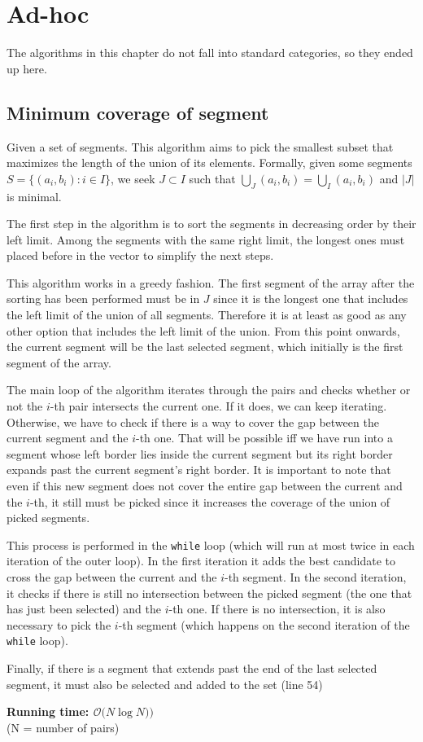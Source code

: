 \chapter{Ad-hoc}
The algorithms in this chapter do not fall into 
standard categories, so they ended up here. 
\section{Minimum coverage of segment}
Given a set of segments. This algorithm aims to pick the
smallest subset that maximizes the length of the union of
its elements.
Formally, given some segments $S=\{(a_i,b_i): i\in I\}$,
we seek $J\subset I$ such that $\bigcup_J (a_i,b_i)= \bigcup_I (a_i,b_i)$ and 
$|J|$ is minimal.

The first step in the algorithm is to sort the segments in decreasing order by
their left limit. Among the segments with the same right limit, the longest
ones must placed before in the vector to simplify the next steps.

This algorithm works in a greedy fashion. The first segment of the array after
the sorting has been performed must be in $J$ since it is the longest one that
includes the left limit of the union of all segments. Therefore it is at least
as good as any other option that includes the left limit of the union. From this
point onwards, the current segment will be the last selected segment, which
initially is the first segment of the array.

The main loop of the algorithm iterates through the pairs and checks whether
or not the $i$-th pair intersects the current one. If it does, we can keep 
iterating. Otherwise, we have to check if there is a way to cover the gap
between the current segment and the $i$-th one. That will be possible iff
we have run into a segment whose left border lies inside the current segment
but its right border expands past the current segment's right border. 
It is important to note that even if this new segment does not cover the 
entire gap between the current and the $i$-th, it still must be picked since
it increases the coverage of the union of picked segments.

This process is performed in the \texttt{while} loop (which will run
at most twice in each iteration of the outer loop). In the first iteration
it adds the best candidate to cross the gap between the current and the $i$-th
segment. In the second iteration, it checks if there is still no intersection
between the picked segment (the one that has just been selected) and the $i$-th
one. If there is no intersection, it is also necessary to pick the $i$-th
segment (which happens on the second iteration of the \texttt{while}
loop).

Finally, if there is a segment that extends past the end of the last 
selected segment, it must also be selected and added to the set (line 54)


\newpage
{}
\noindent \textbf{\boldmath Running time: $\mathcal{O}\big(N \log N)\big)$}
\\ {\small (N = number of pairs)}

